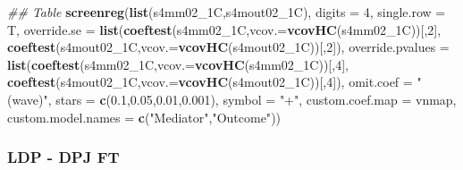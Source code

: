 \documentclass[
]{article}
\newenvironment{Shaded}{\begin{snugshade}}{\end{snugshade}}
\newcommand{\CommentTok}[1]{\textcolor[rgb]{0.56,0.35,0.01}{\textit{#1}}}
\newcommand{\DataTypeTok}[1]{\textcolor[rgb]{0.13,0.29,0.53}{#1}}
\newcommand{\DecValTok}[1]{\textcolor[rgb]{0.00,0.00,0.81}{#1}}
\newcommand{\FloatTok}[1]{\textcolor[rgb]{0.00,0.00,0.81}{#1}}
\newcommand{\KeywordTok}[1]{\textcolor[rgb]{0.13,0.29,0.53}{\textbf{#1}}}
\newcommand{\NormalTok}[1]{#1}
\newcommand{\StringTok}[1]{\textcolor[rgb]{0.31,0.60,0.02}{#1}}
\begin{document}
\begin{Shaded}
\begin{Highlighting}[]
\CommentTok{## Table}
\KeywordTok{screenreg}\NormalTok{(}\KeywordTok{list}\NormalTok{(s4mm02_1C,s4mout02_1C), }\DataTypeTok{digits =} \DecValTok{4}\NormalTok{, }\DataTypeTok{single.row =}\NormalTok{ T,}
          \DataTypeTok{override.se =} \KeywordTok{list}\NormalTok{(}\KeywordTok{coeftest}\NormalTok{(s4mm02_1C,}\DataTypeTok{vcov.=}\KeywordTok{vcovHC}\NormalTok{(s4mm02_1C))[,}\DecValTok{2}\NormalTok{],}
                             \KeywordTok{coeftest}\NormalTok{(s4mout02_1C,}\DataTypeTok{vcov.=}\KeywordTok{vcovHC}\NormalTok{(s4mout02_1C))[,}\DecValTok{2}\NormalTok{]),}
          \DataTypeTok{override.pvalues =} \KeywordTok{list}\NormalTok{(}\KeywordTok{coeftest}\NormalTok{(s4mm02_1C,}\DataTypeTok{vcov.=}\KeywordTok{vcovHC}\NormalTok{(s4mm02_1C))[,}\DecValTok{4}\NormalTok{],}
                                  \KeywordTok{coeftest}\NormalTok{(s4mout02_1C,}\DataTypeTok{vcov.=}\KeywordTok{vcovHC}\NormalTok{(s4mout02_1C))[,}\DecValTok{4}\NormalTok{]),}
          \DataTypeTok{omit.coef =} \StringTok{"(wave)"}\NormalTok{, }\DataTypeTok{stars =} \KeywordTok{c}\NormalTok{(}\FloatTok{0.1}\NormalTok{,}\FloatTok{0.05}\NormalTok{,}\FloatTok{0.01}\NormalTok{,}\FloatTok{0.001}\NormalTok{), }\DataTypeTok{symbol =} \StringTok{"+"}\NormalTok{,}
          \DataTypeTok{custom.coef.map =}\NormalTok{ vnmap, }
          \DataTypeTok{custom.model.names =} \KeywordTok{c}\NormalTok{(}\StringTok{"Mediator"}\NormalTok{,}\StringTok{"Outcome"}\NormalTok{))}
\end{Highlighting}
\end{Shaded}

\hypertarget{ldp---dpj-ft}{%
\subsubsection{LDP - DPJ FT}\label{ldp---dpj-ft}}
\end{document}
